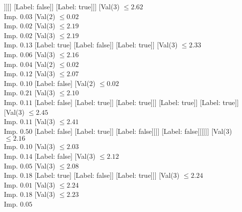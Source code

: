 \documentclass[margin=10pt]{standalone}
\begin{document}
\begin{forest}
																	[Val($3$) $ \leq 2.38$ \\ Imp. $0.03$
																		[Label: true]
																		[Val($3$) $ \leq 2.38$ \\ Imp. $0.38$
																			[Label: false]
																			[Label: true]]]]]
															[Label: false]]
														[Label: true]]]
												[Val($3$) $ \leq 2.62$ \\ Imp. $0.03$
													[Val($2$) $ \leq 0.02$ \\ Imp. $0.02$
														[Val($3$) $ \leq 2.19$ \\ Imp. $0.02$
															[Val($3$) $ \leq 2.19$ \\ Imp. $0.13$
																[Label: true]
																[Label: false]]
															[Label: true]]
														[Val($3$) $ \leq 2.33$ \\ Imp. $0.06$
															[Val($3$) $ \leq 2.16$ \\ Imp. $0.04$
																[Val($2$) $ \leq 0.02$ \\ Imp. $0.12$
																	[Val($3$) $ \leq 2.07$ \\ Imp. $0.10$
																		[Label: false]
																		[Val($2$) $ \leq 0.02$ \\ Imp. $0.21$
																			[Val($3$) $ \leq 2.10$ \\ Imp. $0.11$
																				[Label: false]
																				[Label: true]]
																			[Label: true]]]
																	[Label: true]]
																[Label: true]]
															[Val($3$) $ \leq 2.45$ \\ Imp. $0.11$
																[Val($3$) $ \leq 2.41$ \\ Imp. $0.50$
																	[Label: false]
																	[Label: true]]
																[Label: false]]]]
													[Label: false]]]]]]
								[Val($3$) $ \leq 2.16$ \\ Imp. $0.10$
									[Val($3$) $ \leq 2.03$ \\ Imp. $0.14$
										[Label: false]
										[Val($3$) $ \leq 2.12$ \\ Imp. $0.05$
											[Val($3$) $ \leq 2.08$ \\ Imp. $0.18$
												[Label: true]
												[Label: false]]
											[Label: true]]]
									[Val($3$) $ \leq 2.24$ \\ Imp. $0.01$
										[Val($3$) $ \leq 2.24$ \\ Imp. $0.18$
											[Val($3$) $ \leq 2.23$ \\ Imp. $0.05$

\end{forest}
\end{document}
